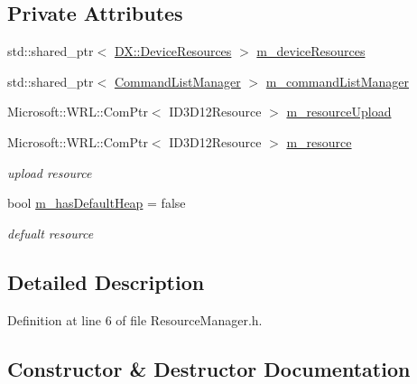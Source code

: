 \subsection*{Private Attributes}
\begin{DoxyCompactItemize}
\item 
std\+::shared\+\_\+ptr$<$ \mbox{\hyperlink{class_d_x_1_1_device_resources}{D\+X\+::\+Device\+Resources}} $>$ \mbox{\hyperlink{class_resource_manager_a91ec892c6045e5911c24c80b4112cad4}{m\+\_\+device\+Resources}}
\item 
std\+::shared\+\_\+ptr$<$ \mbox{\hyperlink{class_command_list_manager}{Command\+List\+Manager}} $>$ \mbox{\hyperlink{class_resource_manager_ad215168d29e86e1c705337d2625c0a05}{m\+\_\+command\+List\+Manager}}
\item 
Microsoft\+::\+W\+R\+L\+::\+Com\+Ptr$<$ I\+D3\+D12\+Resource $>$ \mbox{\hyperlink{class_resource_manager_a5d2576312216c2e85631636f3e76c3b2}{m\+\_\+resource\+Upload}}
\item 
Microsoft\+::\+W\+R\+L\+::\+Com\+Ptr$<$ I\+D3\+D12\+Resource $>$ \mbox{\hyperlink{class_resource_manager_a2190eea97044904955f1fead12732be5}{m\+\_\+resource}}
\begin{DoxyCompactList}\small\item\em upload resource \end{DoxyCompactList}\item 
bool \mbox{\hyperlink{class_resource_manager_ab6e43dce874459d3b2c422959158f0d3}{m\+\_\+has\+Default\+Heap}} = false
\begin{DoxyCompactList}\small\item\em defualt resource \end{DoxyCompactList}\end{DoxyCompactItemize}


\subsection{Detailed Description}


Definition at line 6 of file Resource\+Manager.\+h.



\subsection{Constructor \& Destructor Documentation}
\mbox{\label{class_resource_manager_a5705bb19a33d73b09888aa2f119105fe}} 

